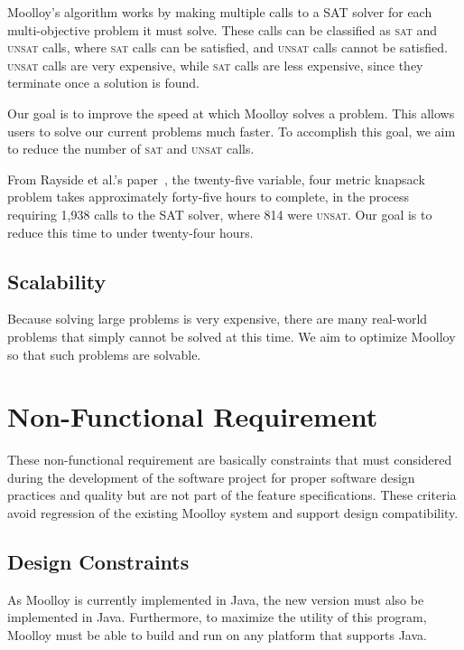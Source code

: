\documentclass[11pt]{article}
\theoremstyle{definition}
\begin{document}
Moolloy's algorithm works by making multiple calls to a SAT solver for
each multi-objective problem it must solve. These calls can be
classified as \textsc{sat} and \textsc{unsat} calls, where \textsc{sat}
calls can be satisfied, and \textsc{unsat} calls cannot be satisfied.
\textsc{unsat} calls are very expensive, while \textsc{sat} calls are
less expensive, since they terminate once a solution is found.

Our goal is to improve the speed at which Moolloy solves a problem.
This allows users to solve our current problems much faster. To
accomplish this goal, we aim to reduce the number of \textsc{sat} and
\textsc{unsat} calls.

From Rayside et al.'s paper~\cite{ref:Rayside09}, the twenty-five
variable, four metric knapsack problem takes approximately forty-five
hours to complete, in the process requiring 1,938 calls to the SAT
solver, where 814 were \textsc{unsat}. Our goal is to reduce this time
to under twenty-four hours.

\subsection{Scalability}\label{sec:perf_scale}

Because solving large problems is very expensive, there are many
real-world problems that simply cannot be solved at this time. We aim
to optimize Moolloy so that such problems are solvable.

\section{Non-Functional Requirement}\label{sec:nonfunctional}
These non-functional requirement are basically constraints that must considered during the development of the software project for proper software design practices and quality but are not part of the feature specifications.  These criteria avoid regression of the existing Moolloy system and support design compatibility.

\subsection{Design Constraints}\label{sec:constraints}

As Moolloy is currently implemented in Java, the new version must also
be implemented in Java. Furthermore, to maximize the utility of this
program, Moolloy must be able to build and run on any platform that
supports Java.
\end{document}

